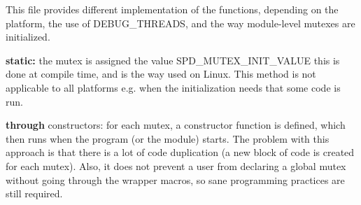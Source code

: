 This file provides different implementation of the functions, depending on the platform, the use of DEBUG\_\-THREADS, and the way module-\/level mutexes are initialized.


\begin{DoxyItemize}
\item {\bfseries static:} the mutex is assigned the value SPD\_\-MUTEX\_\-INIT\_\-VALUE this is done at compile time, and is the way used on Linux. This method is not applicable to all platforms e.g. when the initialization needs that some code is run.
\end{DoxyItemize}


\begin{DoxyItemize}
\item {\bfseries through} constructors: for each mutex, a constructor function is defined, which then runs when the program (or the module) starts. The problem with this approach is that there is a lot of code duplication (a new block of code is created for each mutex). Also, it does not prevent a user from declaring a global mutex without going through the wrapper macros, so sane programming practices are still required. 
\end{DoxyItemize}